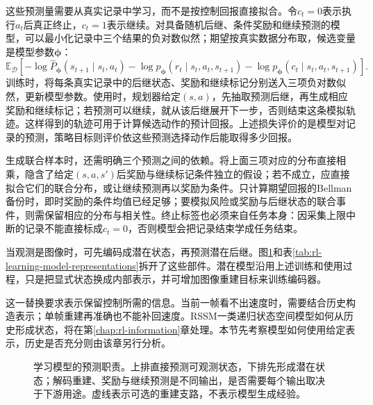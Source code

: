 这些预测量需要从真实记录中学习，而不是按控制回报直接拟合。令$c_t=0$表示执行$a_t$后真正终止，$c_t=1$表示继续。对具备随机后继、条件奖励和继续预测的模型，可以最小化记录中三个结果的负对数似然；期望按真实数据分布取，候选变量是模型参数$\bm\phi$：
\[
  \mathbb E_{\mathcal D}\!\left[
    -\log\widehat P_{\bm\phi}(s_{t+1}\mid s_t,a_t)
    -\log p_{\bm\phi}(r_t\mid s_t,a_t,s_{t+1})
    -\log p_{\bm\phi}(c_t\mid s_t,a_t,s_{t+1})
  \right].
\]
训练时，将每条真实记录中的后继状态、奖励和继续标记分别送入三项负对数似然，更新模型参数。使用时，规划器给定$(s,a)$，先抽取预测后继，再生成相应奖励和继续标记；若预测可以继续，就从该后继展开下一步，否则结束这条模拟轨迹。这样得到的轨迹可用于计算候选动作的预计回报。上述损失评价的是模型对记录的预测，策略目标则评价依这些预测选择动作后能取得多少回报。

生成联合样本时，还需明确三个预测之间的依赖。将上面三项对应的分布直接相乘，隐含了给定$(s,a,s')$后奖励与继续标记条件独立的假设；若不成立，应直接拟合它们的联合分布，或让继续预测再以奖励为条件。只计算期望回报的Bellman备份时，即时奖励的条件均值已经足够；要模拟风险或奖励与后继状态的联合事件，则需保留相应的分布与相关性。终止标签也必须来自任务本身：因采集上限中断的记录不能直接标成$c_t=0$，否则模型会把记录结束学成任务结束。

当观测是图像时，可先编码成潜在状态，再预测潜在后继。图\ref{fig:rl-learning-model-anatomy}和表\ref{tab:rl-learning-model-representations}拆开了这些部件。潜在模型沿用上述训练和使用过程，只是把显式状态换成内部表示，并可增加图像重建目标来训练编码器。

这一替换要求表示保留控制所需的信息。当前一帧看不出速度时，需要结合历史构造表示；单帧重建再准确也不能补回速度。RSSM一类递归状态空间模型如何从历史形成状态，将在第\ref{chap:rl-information}章处理。本节先考察模型如何使用给定表示，历史是否充分则由该章另行分析。

\begin{figure}[t]
  \centering
  
  \caption{学习模型的预测职责。上排直接预测可观测状态，下排先形成潜在状态；解码重建、奖励与继续预测是不同输出，是否需要每个输出取决于下游用途。虚线表示可选的重建支路，不表示模型生成经验。}
  \label{fig:rl-learning-model-anatomy}
\end{figure}

